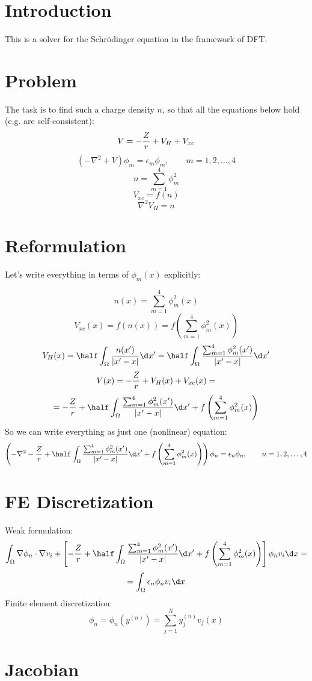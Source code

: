 \documentclass[11pt]{article}
\begin{document}
\section{Introduction}

This is a solver for the Schr\"odinger equation in the framework of DFT.

\section{Problem}

The task is to find such a charge density $n$, so that all the equations below hold (e.g. are
self-consistent):
$$ V = -{Z\over r} + V_H + V_{xc} $$
$$
\left(-\nabla^2+V\right)\phi_m = \epsilon_m\phi_m,\quad\quad m = 1, 2, \dots, 4
$$
$$ n = \sum_{m=1}^4 \phi_m^2 $$
$$ V_{xc} = f(n) $$
$$ \nabla^2 V_H = n $$

\section{Reformulation}

Let's write everything in terms of $\phi_m(x)$ explicitly:

$$n(x) = %
\sum_{m=1}^4 \phi_m^2(x)$$
$$V_{xc}(x) = f(n(x)) = f\left( \sum_{m=1}^4\phi_m^2(x) \right)$$
$$V_H(x) = \half \int_\Omega {n(x')\over|x' - x|}\d x'=
\half \int_\Omega {
\sum_{m=1}^4 \phi_m^2(x')
\over|x' - x|}\d x'
$$
$$V(x) = -{Z\over r} + V_H(x) + V_{xc}(x)=$$
$$
=-{Z\over r}+
\half \int_\Omega {
\sum_{m=1}^4 \phi_m^2(x')
\over|x' - x|}\d x'
+f\left( \sum_{m=1}^4\phi_m^2(x) \right)
$$
So we can write everything as just one (nonlinear)
equation:
$$
\left(-\nabla^2
-{Z\over r}+
\half \int_\Omega {
\sum_{m=1}^4 \phi_m^2(x')
\over|x' - x|}\d x'
+f\left( \sum_{m=1}^4\phi_m^2(x) \right)
\right)\phi_n = \epsilon_n\phi_n,\quad\quad n = 1, 2, \dots, 4
$$

\section{FE Discretization}

Weak formulation:
$$
\int_\Omega \nabla\phi_n\cdot\nabla v_i+\left[
-{Z\over r}+
\half \int_\Omega {
\sum_{m=1}^4 \phi_m^2(x')
\over|x' - x|}\d x'
+f\left( \sum_{m=1}^4\phi_m^2(x) \right)
\right]
\phi_n v_i  \d x=
$$
$$
=\int_\Omega
\epsilon_n\phi_n v_i \d x
$$
Finite element discretization:
$$\phi_n = \phi_n(y^{(n)}) = \sum_{j=1}^N y_j^{(n)} v_j(x)$$

\section{Jacobian}
\end{document}

